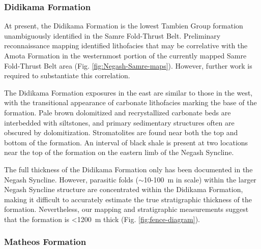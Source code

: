 \subsubsection{Didikama Formation}

At present, the Didikama Formation is the lowest Tambien Group formation unambiguously identified in the Samre Fold-Thrust Belt. Preliminary reconnaissance mapping identified lithofacies that may be correlative with the Amota Formation in the westernmost portion of the currently mapped Samre Fold-Thrust Belt area (Fig. \ref{fig:Negash-Samre-maps}). However, further work is required to substantiate this correlation.

The Didikama Formation exposures in the east are similar to those in the west, with the transitional appearance of carbonate lithofacies marking the base of the formation. Pale brown dolomitized and recrystallized carbonate beds are interbedded with siltstones, and primary sedimentary structures often are obscured by dolomitization. Stromatolites are found near both the top and bottom of the formation. An interval of black shale is present at two locations near the top of the formation on the eastern limb of the Negash Syncline.

The full thickness of the Didikama Formation only has been documented in the Negash Syncline. However, parasitic folds ($\sim$10-100~m in scale) within the larger Negash Syncline structure are concentrated within the Didikama Formation, making it difficult to accurately estimate the true stratigraphic thickness of the formation. Nevertheless, our mapping and stratigraphic measurements suggest that the formation is \textless1200~m thick (Fig. \ref{fig:fence-diagram}).

\subsubsection{Matheos Formation}

